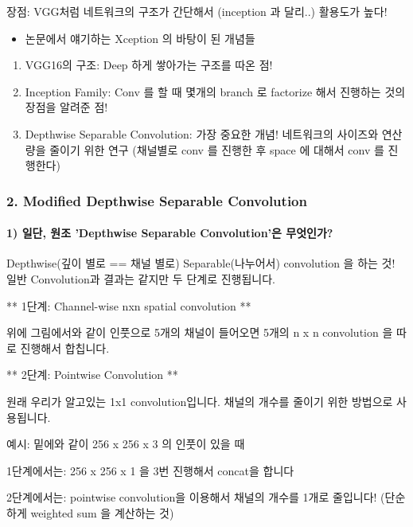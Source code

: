 \documentclass[11pt]{article}
\providecommand{\tightlist}{%
      \setlength{\itemsep}{0pt}\setlength{\parskip}{0pt}}
\begin{document}
장점: VGG처럼 네트워크의 구조가 간단해서 (inception 과 달리..) 활용도가
높다!

\begin{itemize}
\tightlist
\item
  논문에서 얘기하는 Xception 의 바탕이 된 개념들
\end{itemize}

\begin{enumerate}
\def\labelenumi{\arabic{enumi}.}
\tightlist
\item
  VGG16의 구조: Deep 하게 쌓아가는 구조를 따온 점!
\item
  Inception Family: Conv 를 할 때 몇개의 branch 로 factorize 해서
  진행하는 것의 장점을 알려준 점!
\item
  Depthwise Separable Convolution: 가장 중요한 개념! 네트워크의 사이즈와
  연산량을 줄이기 위한 연구 (채널별로 conv 를 진행한 후 space 에 대해서
  conv 를 진행한다)
\end{enumerate}

    \subsubsection{2. Modified Depthwise Separable
Convolution}\label{modified-depthwise-separable-convolution}

\paragraph{1) 일단, 원조 'Depthwise Separable Convolution'은
무엇인가?}\label{uxc77cuxb2e8-uxc6d0uxc870-depthwise-separable-convolutionuxc740-uxbb34uxc5c7uxc778uxac00}

Depthwise(깊이 별로 == 채널 별로) Separable(나누어서) convolution 을
하는 것! 일반 Convolution과 결과는 같지만 두 단계로 진행됩니다.

** 1단계: Channel-wise nxn spatial convolution **

위에 그림에서와 같이 인풋으로 5개의 채널이 들어오면 5개의 n x n
convolution 을 따로 진행해서 합칩니다.

** 2단계: Pointwise Convolution **

원래 우리가 알고있는 1x1 convolution입니다. 채널의 개수를 줄이기 위한
방법으로 사용됩니다.

예시: 밑에와 같이 256 x 256 x 3 의 인풋이 있을 때

1단계에서는: 256 x 256 x 1 을 3번 진행해서 concat을 합니다

2단계에서는: pointwise convolution을 이용해서 채널의 개수를 1개로
줄입니다! (단순하게 weighted sum 을 계산하는 것)
\end{document}
